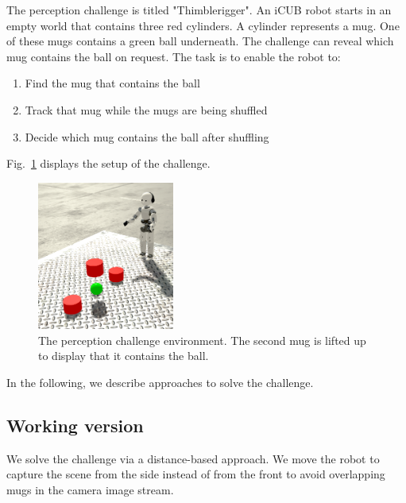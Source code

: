 \documentclass[conference]{IEEEtran}
\begin{document}
The perception challenge is titled "Thimblerigger". An iCUB robot starts in an empty world that contains three red cylinders. A cylinder represents a mug.
One of these mugs contains a green ball underneath. The challenge can reveal which mug contains the ball on request.
The task is to enable the robot to: 
\begin{enumerate}
	\item Find the mug that contains the ball
	\item Track that mug while the mugs are being shuffled
	\item Decide which mug contains the ball after shuffling
\end{enumerate}

Fig.~\ref{fig:challenge} displays the setup of the challenge.

\begin{figure}
	\centering
	\includegraphics[width=0.4\textwidth]{logos/challenge}
	\caption{The perception challenge environment. The 	second mug is lifted up to display that it contains the 	ball.}
	\label{fig:challenge}
\end{figure}

In the following, we describe approaches to solve the challenge.

\subsection{Working version}
\label{sec:working}
We solve the challenge via a distance-based approach. We move the robot to capture the scene from the side instead of from the front to avoid overlapping mugs in the camera image stream.
\end{document}
